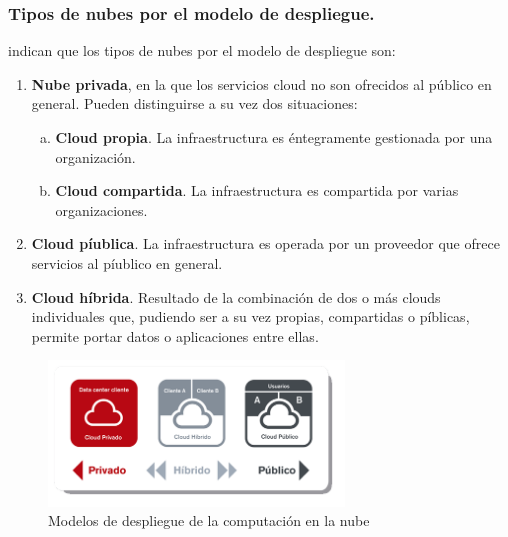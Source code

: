 \subsubsection{Tipos de nubes por el modelo de despliegue.}
\cite{nist} indican que los tipos de nubes por el modelo de despliegue son:
\begin{enumerate}
    \item \textbf{Nube privada}, en  la  que  los  servicios  cloud  no  son
          ofrecidos  al  p\'ublico  en  general. Pueden distinguirse a su vez dos
          situaciones:
          \begin{enumerate}[a.]
              \item \textbf{Cloud propia}. La infraestructura es \'entegramente gestionada
                    por una organizaci\'on.
              \item \textbf{Cloud compartida}. La  infraestructura  es  compartida  por
                    varias organizaciones.
          \end{enumerate}
    \item \textbf{Cloud p\'iublica}. La  infraestructura  es  operada  por  un
          proveedor  que  ofrece  servicios al p\'iublico en general.
    \item \textbf{Cloud h\'ibrida}. Resultado de la combinaci\'on de dos o m\'as clouds
          individuales que, pudiendo ser a su vez propias, compartidas o p\'iblicas,
          permite portar datos o aplicaciones entre ellas.
\end{enumerate}

\begin{figure}[h]
    \centering
    \captionsetup{justification=centering}
    \includegraphics[width=0.7\textwidth]{Imagenes/Bitmap/cloud0}
    \caption{Modelos de despliegue de la computaci\'on en la nube}
    \label{fig:cloud1}
\end{figure}

